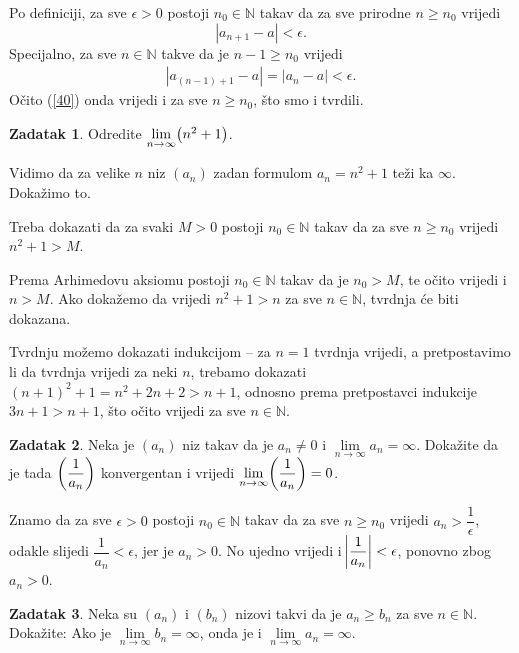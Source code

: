 \documentclass{book}
\let\originalleft\left
\let\originalright\right
\renewcommand{\left}{\mathopen{}\mathclose\bgroup\originalleft}
\renewcommand{\right}{\aftergroup\egroup\originalright}
\renewenvironment{proof}{%
    \vspace{-\parskip}\begin{oldproof}%
    }{%
    \end{oldproof}%
}
\theoremstyle{definition}
\theoremstyle{definition}
\newtheorem{exercise}{Zadatak}
\theoremstyle{remark}
\begin{document}
\begin{proof}[Rješenje]
Po definiciji, za sve $\epsilon>0$ postoji $n_0\in \mathbb{N}$ takav da za sve prirodne $n\geq n_0$ vrijedi $$|a_{n+1}-a|<\epsilon.$$ Specijalno, za sve $n\in \mathbb{N}$ takve da je $n-1\geq n_0$ vrijedi 
\begin{gather}
\label{40}
|a_{(n-1)+1}-a|=|a_n-a|<\epsilon.
\end{gather}
Očito (\ref{40}) onda vrijedi i za sve $n\geq n_0$, što smo i tvrdili.
\end{proof}
\begin{exercise}
Odredite $\lim\limits_{n\to \infty} \left(n^2+1\right)$.
\end{exercise}
\begin{proof}[Rješenje]
Vidimo da za velike $n$ niz $(a_n)$ zadan formulom $a_n=n^2+1$ teži ka $\infty$. Dokažimo to. 

Treba dokazati da za svaki $M>0$ postoji $n_0\in \mathbb{N}$ takav da za sve $n\geq n_0$ vrijedi $n^2+1>M$. 

Prema Arhimedovu aksiomu postoji $n_0\in \mathbb{N}$ takav da je $n_0>M$, te očito vrijedi i $n>M$. Ako dokažemo da vrijedi $n^2+1>n$ za sve $n\in \mathbb{N}$, tvrdnja će biti dokazana. 

Tvrdnju možemo dokazati indukcijom -- za $n=1$ tvrdnja vrijedi, a pretpostavimo li da tvrdnja vrijedi za neki $n$, trebamo dokazati $(n+1)^2+1=n^2+2n+2>n+1$, odnosno prema pretpostavci indukcije $3n+1>n+1$, što očito vrijedi za sve $n\in \mathbb{N}$.
\end{proof}
\begin{exercise}
\label{6}
Neka je $(a_n)$ niz takav da je $a_n\neq 0$ i $\lim\limits_{n\to \infty}{a_n}=\infty$. Dokažite da je tada $\left(\dfrac{1}{a_n}\right)$ konvergentan i vrijedi $\lim\limits_{n\to \infty}\left(\dfrac{1}{a_n}\right)=0$.
\end{exercise}
\begin{proof}[Rješenje]
Znamo da za sve $\epsilon>0$ postoji $n_0\in \mathbb{N}$ takav da za sve $n\geq n_0$ vrijedi $a_n>\dfrac{1}{\epsilon}$, odakle slijedi $\dfrac{1}{a_n}<\epsilon$, jer je $a_n>0$. No ujedno vrijedi i $\abs{\dfrac{1}{a_n}}<\epsilon$, ponovno zbog $a_n>0$.
\end{proof}
\begin{exercise}
\label{liminftylemma}
Neka su $(a_n)$ i $(b_n)$ nizovi takvi da je $a_n\geq b_n$ za sve $n\in \mathbb{N}$. Dokažite: Ako je $\lim\limits_{n\to \infty}{b_n}=\infty$, onda je i $\lim\limits_{n\to \infty}{a_n}=\infty$.
\end{exercise}
\end{document}
